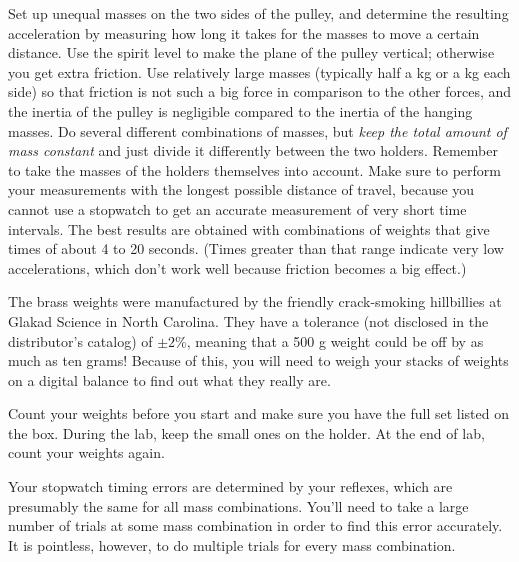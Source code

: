 \label{lab:atwood}

\apparatus
{}


\observations


Set up unequal masses on the two sides of the pulley, and
determine the resulting acceleration by measuring how long
it takes for the masses to move a certain distance. 
Use the spirit level to make the plane of the pulley vertical; otherwise you
get extra friction.
Use relatively large
masses (typically half a kg or a kg each side) so that friction
is not such a big force in comparison to the other forces, and
the inertia of the pulley is negligible compared to the inertia
of the hanging masses.
Do several different combinations of masses, but \emph{keep
the total amount of mass constant} and just divide it
differently between the two holders.  Remember to take the
masses of the holders themselves into account. Make sure to
perform your measurements with the longest possible distance
of travel, because you cannot use a stopwatch to get an
accurate measurement of very short time intervals. The best
results are obtained with combinations of weights that give
times of about 4 to 20 seconds. (Times greater than that range
indicate very low accelerations, which don't work well because
friction becomes a big effect.)

The brass weights were manufactured by the friendly crack-smoking
hillbillies at Glakad Science in North Carolina. They have a tolerance (not
disclosed in the distributor's catalog) of $\pm 2$\%, meaning
that a 500 g weight could be off by as much as ten grams!
Because of this, you will need to weigh your stacks of weights on
a digital balance to find out what they really are.

Count your weights before you start and make sure you have the full
set listed on the box. During the lab, keep the small ones on the holder.
At the end of lab, count your weights again.

Your stopwatch timing errors are determined by your reflexes, which
are presumably the same for all mass combinations. You'll need to take a large
number of trials at some mass combination in order to find this error accurately.
It is pointless, however, to do multiple trials for every mass combination.

